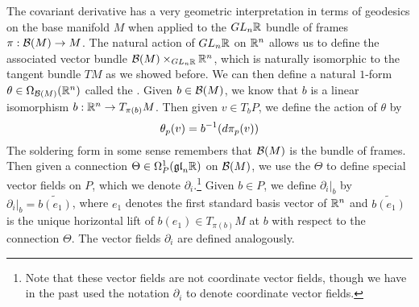 %
The covariant derivative has a very geometric interpretation in terms of
geodesics on the base manifold $M$ when applied to the $GL_n\mathbb{R}$ bundle of frames
$\pi : \mathcal{B}(M) \to M$. The natural action of $GL_n\mathbb{R}$ on $\mathbb{R}^n$ allows us to
define the associated vector bundle $\mathcal{B}(M) \times_{GL_n\mathbb{R}} \mathbb{R}^n$, which is
naturally isomorphic to the tangent bundle $TM$ as we showed before. We can then
define a natural $1$-form $\theta \in \Omega_{\mathcal{B}(M)}(\mathbb{R}^n)$ called the
. Given $b \in \mathcal{B}(M)$, we know that $b$ is a linear
isomorphism $b : \mathbb{R}^n \to T_{\pi(b)}M$. Then given $v \in T_bP$, we
define the action of $\theta$ by
\[
\theta_p(v) = b^{-1}(d\pi_p(v))
\]
The soldering form in some sense remembers that $\mathcal{B}(M)$ is the bundle of
frames. Then given a connection $\Theta \in \Omega_P^1(\mathfrak{gl}_n\mathbb{R})$ on $\mathcal{B}(M)$,
we use the $\Theta$ to define special vector fields on $P$, which we
denote $\partial_i$.\footnote{Note that these vector fields are not coordinate
vector fields, though we have in the past used the notation $\partial_i$ to
denote coordinate vector fields.} Given $b \in P$, we define $\partial_i\vert_b$
by $\partial_i\vert_b = \widetilde{b(e_1)}$, where $e_1$ denotes the first
standard basis vector of $\mathbb{R}^n$ and $\widetilde{b(e_1)}$ is the unique horizontal
lift of $b(e_1) \in T_{\pi(b)}M$ at $b$ with respect to the connection $\Theta$.
The vector fields $\partial_i$ are defined analogously.







